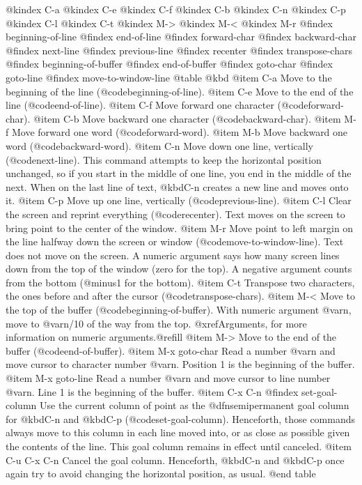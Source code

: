 {{{@kindex C-a
@kindex C-e
@kindex C-f
@kindex C-b
@kindex C-n
@kindex C-p
@kindex C-l
@kindex C-t
@kindex M->
@kindex M-<
@kindex M-r
@findex beginning-of-line
@findex end-of-line
@findex forward-char
@findex backward-char
@findex next-line
@findex previous-line
@findex recenter
@findex transpose-chars
@findex beginning-of-buffer
@findex end-of-buffer
@findex goto-char
@findex goto-line
@findex move-to-window-line
@table @kbd
@item C-a
Move to the beginning of the line (@code{beginning-of-line}).
@item C-e
Move to the end of the line (@code{end-of-line}).
@item C-f
Move forward one character (@code{forward-char}).
@item C-b
Move backward one character (@code{backward-char}).
@item M-f
Move forward one word (@code{forward-word}).
@item M-b
Move backward one word (@code{backward-word}).
@item C-n
Move down one line, vertically (@code{next-line}).  This command
attempts to keep the horizontal position unchanged, so if you start in
the middle of one line, you end in the middle of the next.  When on
the last line of text, @kbd{C-n} creates a new line and moves onto it.
@item C-p
Move up one line, vertically (@code{previous-line}).
@item C-l
Clear the screen and reprint everything (@code{recenter}).  Text moves
on the screen to bring point to the center of the window.
@item M-r
Move point to left margin on the line halfway down the screen or
window (@code{move-to-window-line}).  Text does not move on the
screen.  A numeric argument says how many screen lines down from the
top of the window (zero for the top).  A negative argument counts from
the bottom (@minus{}1 for the bottom).
@item C-t
Transpose two characters, the ones before and after the cursor
(@code{transpose-chars}).
@item M-<
Move to the top of the buffer (@code{beginning-of-buffer}).  With
numeric argument @var{n}, move to @var{n}/10 of the way from the top.
@xref{Arguments}, for more information on numeric arguments.@refill
@item M->
Move to the end of the buffer (@code{end-of-buffer}).
@item M-x goto-char
Read a number @var{n} and move cursor to character number @var{n}.
Position 1 is the beginning of the buffer.
@item M-x goto-line
Read a number @var{n} and move cursor to line number @var{n}.  Line 1
is the beginning of the buffer.
@item C-x C-n
@findex set-goal-column
Use the current column of point as the @dfn{semipermanent goal column} for
@kbd{C-n} and @kbd{C-p} (@code{set-goal-column}).  Henceforth, those
commands always move to this column in each line moved into, or as
close as possible given the contents of the line.  This goal column remains
in effect until canceled.
@item C-u C-x C-n
Cancel the goal column.  Henceforth, @kbd{C-n} and @kbd{C-p} once
again try to avoid changing the horizontal position, as usual.
@end table

}}}

